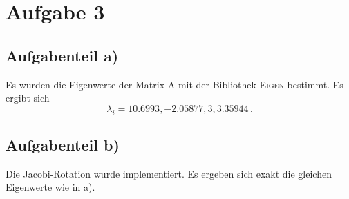 \section{Aufgabe 3}
\subsection{Aufgabenteil a)}
Es wurden die Eigenwerte der Matrix A mit der Bibliothek \textsc{Eigen} bestimmt.
Es ergibt sich
\begin{equation}
  \lambda_i = 10.6993, -2.05877, 3, 3.35944 \, .
\end{equation}
\subsection{Aufgabenteil b)}
Die Jacobi-Rotation wurde implementiert. Es ergeben sich exakt die gleichen
Eigenwerte wie in a).
